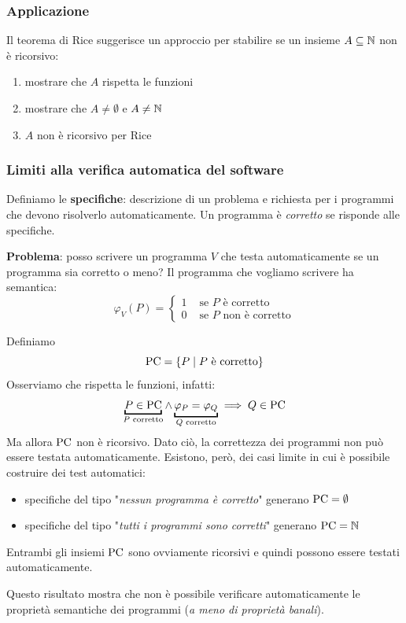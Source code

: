 \vspace{-0.3cm}

\subsubsection{Applicazione}

Il teorema di Rice suggerisce un approccio per stabilire se un insieme $A \subseteq \mathbb{N}$ non è ricorsivo:
\begin{enumerate}
	\item mostrare che $A$ rispetta le funzioni
	\item mostrare che $A \neq \emptyset$ e $A \neq \mathbb{N}$
	\item $A$ non è ricorsivo per Rice
\end{enumerate}

\subsubsection{Limiti alla verifica automatica del software}
Definiamo le \textbf{specifiche}: descrizione di un problema e richiesta per i programmi che devono risolverlo automaticamente. Un programma è \textit{corretto} se risponde alle specifiche.

\textbf{Problema}: posso scrivere un programma $V$ che testa automaticamente se un programma sia corretto o meno? Il programma che vogliamo scrivere ha semantica:
$$
\varphi_V (P) = \begin{cases}
	1 & \text{ se } P \text{ è corretto} \\
	0 & \text{ se } P \text{ non è corretto}
\end{cases}
$$

Definiamo
$$ \text{PC} = \left\{P \mid P \text{ è corretto}\right\}$$
Osserviamo che rispetta le funzioni, infatti:
$$ \underbracket{P \in \pc}_{P \text{ corretto}} \wedge \underbracket{\varphi_P = \varphi_Q}_{Q \text{ corretto}} \implies Q \in \pc $$
Ma allora $\text{PC}$ non è ricorsivo. Dato ciò, la correttezza dei programmi non può essere testata automaticamente. Esistono, però, dei casi limite in cui è possibile costruire dei test automatici:
\begin{itemize}
	\item specifiche del tipo "\textit{nessun programma è corretto}" generano $\text{PC} = \emptyset$
	\item specifiche del tipo "\textit{tutti i programmi sono corretti}" generano $\text{PC} = \mathbb{N}$
\end{itemize}

Entrambi gli insiemi $\text{PC}$ sono ovviamente ricorsivi e quindi possono essere testati automaticamente.

Questo risultato mostra che non è possibile verificare automaticamente le proprietà semantiche dei programmi (\textit{a meno di proprietà banali}).\\


